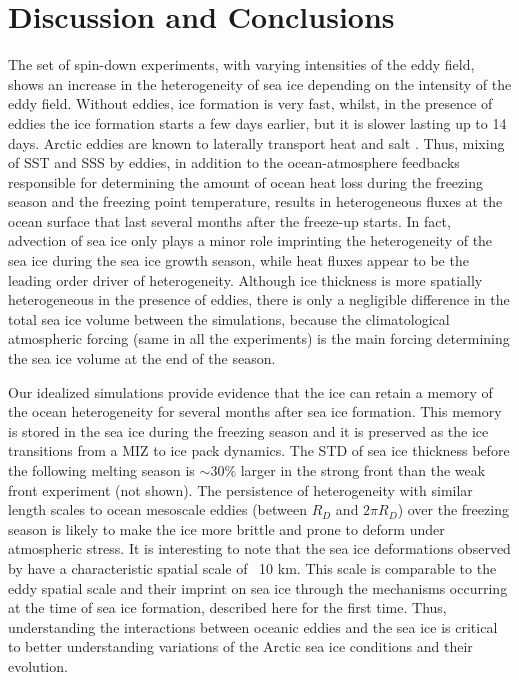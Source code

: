 \documentclass[draft]{agujournal2019}
\begin{document}
\section{Discussion and Conclusions}

The set of spin-down experiments, with varying intensities of the eddy field, shows an increase in the heterogeneity of sea ice depending on the intensity of the eddy field. Without eddies, ice formation is very fast, whilst, in the presence of eddies the ice formation starts a few days earlier, but it is slower lasting up to 14 days. Arctic eddies are known to laterally transport heat and salt \citep{Bashmachnikov_heat_transport_2023, Fine_Microstructure_2018}. Thus, mixing of SST and SSS by eddies, in addition to the ocean-atmosphere feedbacks responsible for determining the amount of ocean heat loss during the freezing season and the freezing point temperature, results in heterogeneous fluxes at the ocean surface that last several months after the freeze-up starts. In fact, advection of sea ice only plays a minor role imprinting the heterogeneity of the sea ice during the sea ice growth season, while heat fluxes appear to be the leading order driver of heterogeneity. Although ice thickness is more spatially heterogeneous in the presence of eddies, there is only a negligible difference in the total sea ice volume between the simulations, because the climatological atmospheric forcing (same in all the experiments) is the main forcing determining the sea ice volume at the end of the season. 

Our idealized simulations provide evidence that the ice can retain a memory of the ocean heterogeneity for several months after sea ice formation. This memory is stored in the sea ice during the freezing season and it is preserved as the ice transitions from a MIZ to ice pack dynamics. The STD of sea ice thickness before the following melting season is $\sim 30\%$ larger in the strong front than the weak front experiment (not shown). The persistence of heterogeneity with similar length scales to ocean mesoscale eddies (between $R_D$ and $2\pi R_D$) over the freezing season is likely to make the ice more brittle and prone to deform under atmospheric stress. It is interesting to note that the sea ice deformations observed by \citet{Rampal_sea_ice_2008} have a characteristic spatial scale of ~10 km. This scale is comparable to the eddy spatial scale and their imprint on sea ice through the mechanisms occurring at the time of sea ice formation, described here for the first time.
Thus, understanding the interactions between oceanic eddies and the sea ice is critical to better understanding variations of the Arctic sea ice conditions and their evolution.
\end{document}

